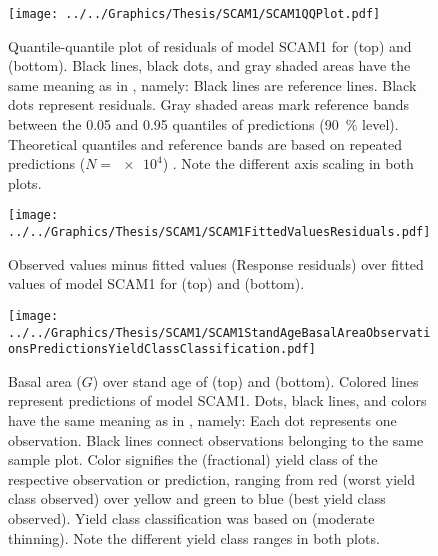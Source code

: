 \begin{figure}[h]
  \centering
  \texttt{[image: ../../Graphics/Thesis/SCAM1/SCAM1QQPlot.pdf]}
  \caption{Quantile-quantile plot of residuals of model SCAM1 for \Beech{} (top) and \Spruce{} (bottom).  Black lines, black dots, and gray shaded areas have the same meaning as in , namely:  Black lines are reference lines.  Black dots represent residuals.  Gray shaded areas mark reference bands between the \num{0.05} and \num{0.95} quantiles of predictions (\SI{90}{\percent} level).  Theoretical quantiles and reference bands are based on repeated predictions (\(N = \num{e4}\)) \parencite{Augustin2012}.  Note the different axis scaling in both plots.}
  \label{fig:SCAM1QQPlot}
\end{figure}

\begin{figure}[h]
  \centering
  \texttt{[image: ../../Graphics/Thesis/SCAM1/SCAM1FittedValuesResiduals.pdf]}
  \caption{Observed values minus fitted values (Response residuals) over fitted values of model SCAM1 for \Beech{} (top) and \Spruce{} (bottom).}
  \label{fig:SCAM1FittedValuesResiduals}
\end{figure}

\begin{figure}[h]
  \centering
  \texttt{[image: ../../Graphics/Thesis/SCAM1/SCAM1StandAgeBasalAreaObservationsPredictionsYieldClassClassification.pdf]}
  \caption{Basal area (\(G\)) over stand age of \Beech{} (top) and \Spruce{} (bottom).  Colored lines represent predictions of model SCAM1.  Dots, black lines, and colors have the same meaning as in , namely:  Each dot represents one observation.  Black lines connect observations belonging to the same sample plot.  Color signifies the (fractional) yield class of the respective observation or prediction, ranging from red (worst yield class observed) over yellow and green to blue (best yield class observed). Yield class classification was based on \textcite{Schober1995} (moderate thinning).  Note the different yield class ranges in both plots.}
  \label{fig:SCAM1StandAgeBasalAreaObservationsPredictionsYieldClassClassification}
\end{figure}

